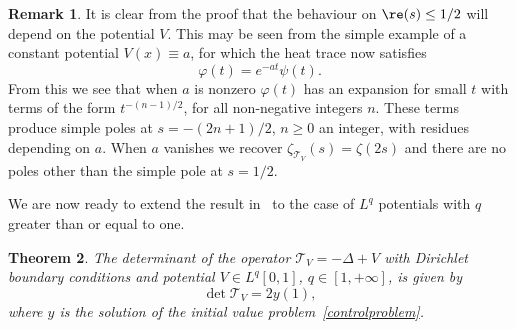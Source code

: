 \documentclass[11pt]{article}
\theoremstyle{plain}
\newtheorem{theorem}{Theorem}
\theoremstyle{definition}
\newtheorem{remark}[theorem]{Remark}
\newcommand{\ttt}{\mathscr{T}}
\let\balpha q
\begin{document}
\begin{remark}
It is clear from the proof that the behaviour on $\re(s)\leq 1/2$ will depend on the potential $V$. This may be seen from the simple example of a constant
potential $V(x) \equiv a$, for which the heat trace now satisfies
\[
\varphi(t) = e^{-a t}\psi(t).
\]
From this we see that when $a$ is nonzero $\varphi(t)$ has an expansion for small $t$ with terms of the form $t^{-(n-1)/2}$, for all non-negative
integers $n$. These terms produce simple poles at $s=-(2n+1)/2$, $n\geq 0$ an integer, with residues depending on $a$. When $a$ vanishes
we recover $\zeta_{\ttt_V}(s) = \zeta(2s)$ and there are no poles other than the simple pole at $s=1/2$.
\end{remark}

We are now ready to extend the result in~\cite{Levit-Smilansky} to the case of
$L^{\balpha}$ potentials with $\balpha$ greater than or equal to one.

\begin{theorem} \label{thm0}
The determinant of the operator $\ttt_V =-\Delta + V$ with Dirichlet boundary
conditions and potential $V\in L^\balpha[0,1]$, $\balpha \in[1,+\infty]$,
is given by
\begin{equation}\label{eq:dety1}
\det\ttt_V = 2y(1),
\end{equation}
where $y$ is the solution of the initial value problem~\eqref{controlproblem}.
\end{theorem}
\end{document}
